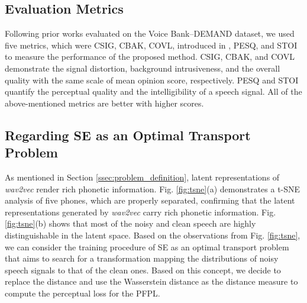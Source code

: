 \documentclass[a4paper]{article}
\begin{document}
\subsection{Evaluation Metrics}
\label{ssec:evaluation_metrics}
Following prior works evaluated on the Voice Bank--DEMAND dataset, we used five metrics, which were CSIG, CBAK, COVL, introduced in \cite{metric}, PESQ, and STOI to measure the performance of the proposed method. CSIG, CBAK, and COVL demonstrate the signal distortion, background intrusiveness, and the overall quality with the same scale of mean opinion score, respectively. PESQ and STOI quantify the perceptual quality and the intelligibility of a speech signal. All of the above-mentioned metrics are better with higher scores.

\subsection{Regarding SE as an Optimal Transport Problem}
\label{ssec:visulaization_on_wav2vec_features}
As mentioned in Section \ref{ssec:problem_definition}, latent representations of \textit{wav2vec} render rich phonetic information. Fig. \ref{fig:tsne}(a) demonstrates a t-SNE analysis of five phones, which are properly separated, confirming that the latent representations generated by \textit{wav2vec} carry rich phonetic information. Fig. \ref{fig:tsne}(b) shows that most of the noisy and clean speech are highly distinguishable in the latent space. Based on the observations from Fig. \ref{fig:tsne}, we can consider the training procedure of SE as an optimal transport problem that aims to search for a transformation mapping the distributions of noisy speech signals to that of the clean ones. Based on this concept, we decide to replace the  distance and use the Wasserstein distance as the distance measure to compute the perceptual loss for the PFPL.
\end{document}
